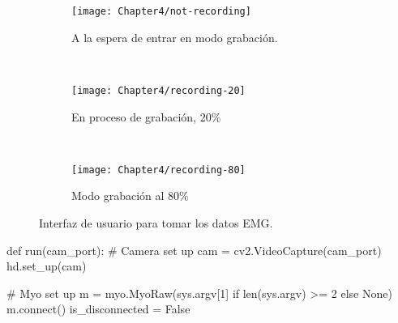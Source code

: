 \begin{figure}
    \centering
    \begin{subfigure}[b]{0.3\textwidth}
        \texttt{[image: Chapter4/not-recording]}
        \caption{A la espera de entrar en modo grabación.}
        \label{fig:not-recording}
    \end{subfigure}
    ~ %
    \begin{subfigure}[b]{0.3\textwidth}
        \texttt{[image: Chapter4/recording-20]}
        \caption{En proceso de grabación, 20\%}
        \label{fig:recording-20}
    \end{subfigure}
    ~ %
    \begin{subfigure}[b]{0.3\textwidth}
        \texttt{[image: Chapter4/recording-80]}
        \caption{Modo grabación al 80\%}
        \label{fig:recording-80}
    \end{subfigure}
    \caption{Interfaz de usuario para tomar los datos EMG.}\label{fig:obtencion-señal-interfaz}
\end{figure}

\begin{python}[frame=none, numbers=left, label={setup}, caption={Conexión de la \textit{webcam} y la Myo}]
def run(cam_port):
    # Camera set up
    cam = cv2.VideoCapture(cam_port)
    hd.set_up(cam)

    # Myo set up
    m = myo.MyoRaw(sys.argv[1] if len(sys.argv) >= 2
    			    else None)
    m.connect()
    is_disconnected = False

\end{python}



